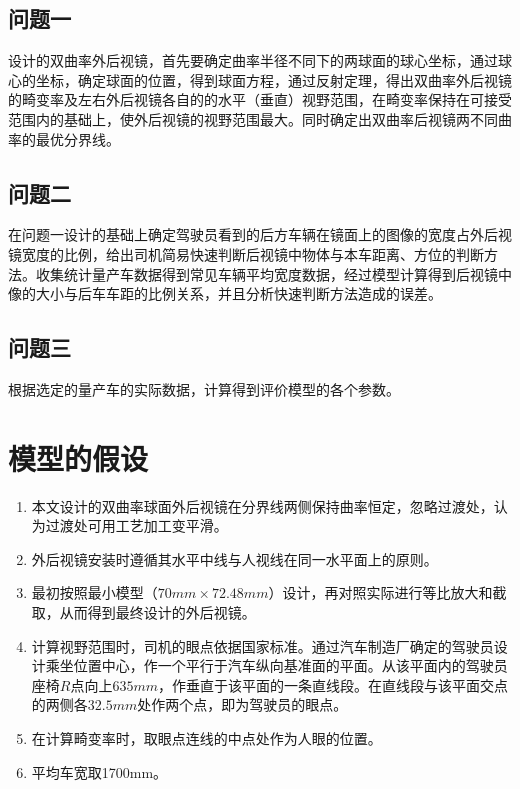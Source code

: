 \documentclass[bwprint]{cumcmthesis}
\begin{document}
\subsection{问题一}

\par 设计的双曲率外后视镜，首先要确定曲率半径不同下的两球面的球心坐标，通过球心的坐标，确定球面的位置，得到球面方程，通过反射定理，得出双曲率外后视镜的畸变率及左右外后视镜各自的的水平（垂直）视野范围，在畸变率保持在可接受范围内的基础上，使外后视镜的视野范围最大。同时确定出双曲率后视镜两不同曲率的最优分界线。
\subsection{问题二}

\par 在问题一设计的基础上确定驾驶员看到的后方车辆在镜面上的图像的宽度占外后视镜宽度的比例，给出司机简易快速判断后视镜中物体与本车距离、方位的判断方法。收集统计量产车数据得到常见车辆平均宽度数据，经过模型计算得到后视镜中像的大小与后车车距的比例关系，并且分析快速判断方法造成的误差。
\subsection{问题三}

\par 根据选定的量产车的实际数据，计算得到评价模型的各个参数。 

\section{模型的假设}

\begin{enumerate}
	\item 本文设计的双曲率球面外后视镜在分界线两侧保持曲率恒定，忽略过渡处，认为过渡处可用工艺加工变平滑。
	\item 外后视镜安装时遵循其水平中线与人视线在同一水平面上的原则。
	\item 最初按照最小模型（$70mm \times 72.48mm$）设计，再对照实际进行等比放大和截取，从而得到最终设计的外后视镜。
	\item 计算视野范围时，司机的眼点依据国家标准。通过汽车制造厂确定的驾驶员设计乘坐位置中心，作一个平行于汽车纵向基准面的平面。从该平面内的驾驶员座椅$R$点向上$635mm$，作垂直于该平面的一条直线段。在直线段与该平面交点的两侧各$32.5mm$处作两个点，即为驾驶员的眼点。
	\item 在计算畸变率时，取眼点连线的中点处作为人眼的位置。
	\item 平均车宽取1700mm。  
\end{enumerate}
\end{document}
